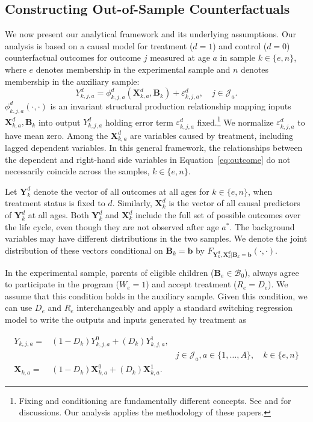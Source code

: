 \subsection{Constructing Out-of-Sample Counterfactuals}\label{section:just}

We now present our analytical framework and its underlying assumptions. Our analysis is based on a causal model for treatment ($d=1$) and control ($d=0$) counterfactual outcomes for outcome $j$ measured at age $a$ in sample $k \in \{e,n\}$, where $e$ denotes membership in the experimental sample and $n$ denotes membership in the auxiliary sample:
\begin{equation}\label{eq:outcome}
Y^d_{k,j,a} = \phi^d_{k,j,a} (\bm{X}^d_{k,a}, \bm{B}_k) + \varepsilon^d_{k,j,a}, \quad j \in \mathcal{J}_a.
\end{equation}
$\phi^d_{k,j,a}\left( \cdot, \cdot \right)$ is an invariant structural production relationship mapping inputs $\bm{X}^d_{k,a}, \bm{B}_k$ into output $Y^d_{k,j,a}$ holding error term $\varepsilon^d_{k,j,a}$ fixed.\footnote{Fixing and conditioning are fundamentally different concepts. See \cite{Haavelmo_1943_Econometrica} and \citet{Heckman_Pinto_2015_EconometTheory} for discussions. Our analysis applies the methodology of these papers.} We normalize $\varepsilon^d_{k,j,a}$ to have mean zero. Among the $\bm{X}^d_{k,a}$ are variables caused by treatment, including lagged dependent variables. In this general framework, the relationships between the dependent and right-hand side variables in Equation~\eqref{eq:outcome} do not necessarily coincide across the samples, $k \in \{e,n\}$.

Let $\bm{Y}_k^d$ denote the vector of all outcomes at all ages for $k \in \{e, n \}$, when treatment status is fixed to $d$. Similarly, $\bm{X}_k^d$ is the vector of all causal predictors of $\bm{Y}_k^d$ at all ages. Both $\bm{Y}_k^d$ and $\bm{X}_k^d$ include the full set of possible outcomes over the life cycle, even though they are not observed after age $a^*$. The background variables may have different distributions in the two samples. We denote the joint distribution of these vectors conditional on $\bm{B}_k = \bm{b}$ by $F_{\bm{Y}_k^d, \bm{X}_k^d | \bm{B}_k = \bm{b}}(\cdot,\cdot)$.

In the experimental sample, parents of eligible children ($\bm{B}_e \in \mathcal{B}_{0}$), always agree to participate in the program ($W_e = 1$) and accept treatment ($R_e = D_e$). We assume that this condition holds in the auxiliary sample. Given this condition, we can use $D_e$ and $R_e$ interchangeably and apply a standard \citet{Quandt_1972_JASA} switching regression model to write the outputs and inputs generated by treatment as
\begin{spacing}{1}
\begin{align}\label{eq:countersystem}
Y_{k,j,a} =& \left( 1 - D_k \right) Y_{k,j,a}^0 + \left( D_k \right) Y_{k,j,a}^1, \\
&&j \in \mathcal{J}_a, a \in \{1,\dots,A\}, \quad k \in \{e,n\} \nonumber \\
\bm{X}_{k,a} =& \left( 1 - D_k \right) \bm{X}_{k,a}^0 + \left( D_k \right) \bm{X}_{k,a}^1. \nonumber
\end{align}
\end{spacing}

